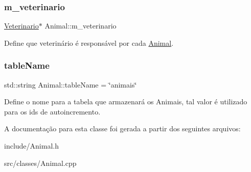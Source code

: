 \subsubsection{\texorpdfstring{m\+\_\+veterinario}{m\_veterinario}}
{\footnotesize\ttfamily \hyperlink{classVeterinario}{Veterinario}$\ast$ Animal\+::m\+\_\+veterinario\hspace{0.3cm}{\ttfamily [protected]}}

Define que veterinário é responsável por cada \hyperlink{classAnimal}{Animal}. \mbox{\label{classAnimal_a09d2d66762ed1fea5c6858d092b6ccb9}} 
\subsubsection{\texorpdfstring{table\+Name}{tableName}}
{\footnotesize\ttfamily std\+::string Animal\+::table\+Name = \char`\"{}animais\char`\"{}\hspace{0.3cm}{\ttfamily [static]}}

Define o nome para a tabela que armazenará os Animais, tal valor é utilizado para os ids de autoincremento. 

A documentação para esta classe foi gerada a partir dos seguintes arquivos\+:\begin{DoxyCompactItemize}
\item 
include/Animal.\+h\item 
src/classes/Animal.\+cpp\end{DoxyCompactItemize}
